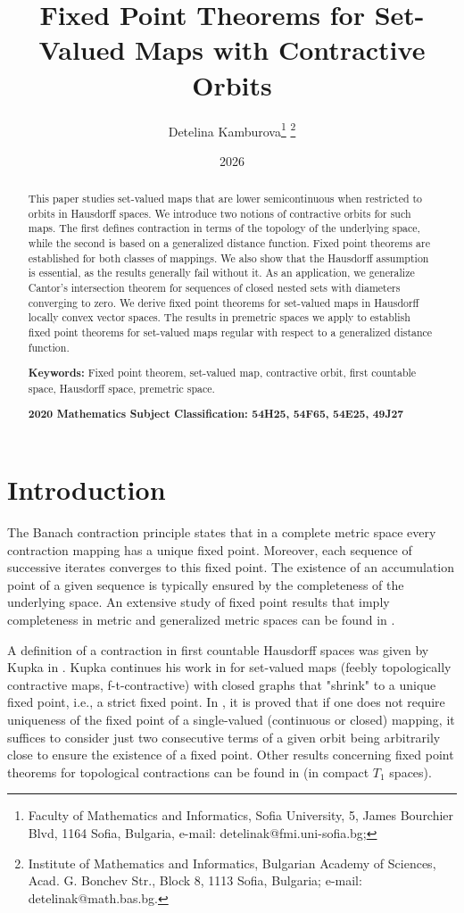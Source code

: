 \documentclass{article}
\title{Fixed Point Theorems for Set-Valued Maps with Contractive Orbits}
\author{Detelina Kamburova\thanks{Faculty of Mathematics and Informatics, Sofia University,   5, James Bourchier Blvd, 1164 Sofia, Bulgaria, e-mail: detelinak@fmi.uni-sofia.bg;} \thanks{ Institute of Mathematics and Informatics, Bulgarian Academy of Sciences, Acad. G. Bonchev Str., Block 8,
1113 Sofia, Bulgaria;
e-mail: detelinak@math.bas.bg.}}
\date{2026}
\begin{document}
\maketitle

\begin{abstract}
This paper studies set-valued maps that are lower semicontinuous when restricted to orbits in Hausdorff spaces. We introduce two notions of contractive orbits for such maps. The first defines contraction in terms of the topology of the underlying space, while the second is based on a generalized distance function. Fixed point theorems are established for both classes of mappings. We also show that the Hausdorff assumption is essential, as the results generally fail without it. As an application, we generalize Cantor's intersection theorem for sequences of closed nested sets with diameters converging to zero. We derive fixed point theorems for set-valued maps in Hausdorff locally convex vector spaces. The results in premetric spaces we apply to establish fixed point theorems for set-valued maps regular with respect to a generalized distance function.

\noindent
\textbf{Keywords:} Fixed point theorem, set-valued map, contractive orbit, first countable space, Hausdorff space, premetric space.

\noindent
\textbf{2020 Mathematics Subject Classification: 54H25, 54F65, 54E25, 49J27} 
\end{abstract}

\section{Introduction} 



The Banach contraction principle states that in a complete metric space every contraction mapping has a unique fixed point. Moreover, each sequence of successive iterates converges to this fixed point. The existence of an accumulation point of a given sequence is typically ensured by the completeness of the underlying space.  An extensive study of fixed point results that imply completeness in metric and generalized metric spaces can be found in \cite{Cob}.

A definition of a contraction in first countable Hausdorff spaces was given by Kupka in \cite{Kupka}. Kupka continues his work in \cite{Kupka_Sl} for set-valued maps (feebly topologically contractive maps, f-t-contractive) with closed graphs that "shrink" to a unique fixed point, i.e., a strict fixed point. In \cite{MR}, it is proved that if one does not require uniqueness of the fixed point of a single-valued (continuous or closed) mapping, it suffices to consider just two consecutive terms of a given orbit being arbitrarily close to ensure the existence of a fixed point. Other results concerning fixed point theorems for topological contractions can be found in  \cite{MR_B} (in compact $T_1$ spaces).
\end{document}
